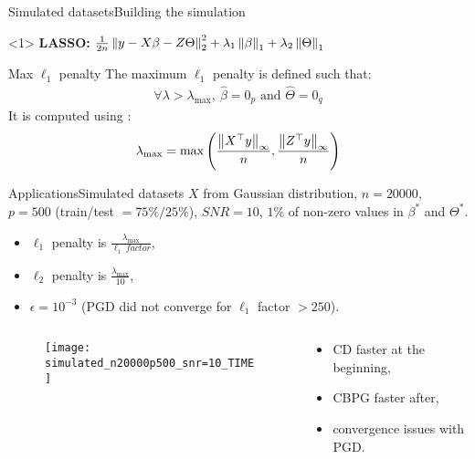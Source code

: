\documentclass[10pt,aspectratio=43]{beamer}
\begin{document}
\begin{frame}{Simulated datasets}{Building the simulation}


\begin{onlyenv}<1>
    \textbf{LASSO:} $ \frac{1}{2n}\left \lVert y-X\beta - Z\Theta \right \rVert_2^2
    + \lambda_{1}\left \lVert \beta \right \rVert_1 + \lambda_{2}\left \lVert \Theta \right \rVert_1$
\begin{block}{Max $\ell_1$ penalty}
The maximum $\ell_1$ penalty is defined such that:
\begin{align*}
    \forall \lambda > \lambda_{\max},\  \hat\beta=0_p \text{ and } \hat\Theta=0_q
\end{align*}
It is computed using \citep{Fercoq_Gramfort_Salmon15}:
\begin{align*}
	\lambda_{\max} = \max\left(\frac{\left \lVert X^\top y \right \rVert_\infty}{n},
							\frac{\left \lVert Z^\top y \right \rVert_\infty}{n}\right)
\end{align*}
\end{block}
\end{onlyenv}

\end{frame}


\begin{frame}{Applications}{Simulated datasets}
$X$ from Gaussian distribution, $n=20000$, $p=500$ (train/test $=75\%/25\%$), $SNR=10$,
$1\%$ of non-zero values in $\beta^*$ and $\Theta^*$.
\begin{itemize}
    \item $\ell_1$ penalty is $\frac{\lambda_{\max}}{\ell_1\ factor}$,
    \item $\ell_2$ penalty is $\frac{\lambda_{\max}}{10}$,
    \item $\epsilon=10^{-3}$ (PGD did not converge for $\ell_1$ factor
    $> 250$).
\end{itemize}
\begin{columns}
\begin{column}{.59\textwidth}
\begin{figure}[h]
    \centering
    \texttt{[image: simulated\_n20000p500\_snr=10\_TIME]}
\end{figure}
\end{column}
\begin{column}{.4\textwidth}
\begin{itemize}
    \item CD faster at the beginning,
    \item CBPG faster after,
    \item convergence issues with PGD.
\end{itemize}
\end{column}
\end{columns}
\end{frame}
\end{document}
